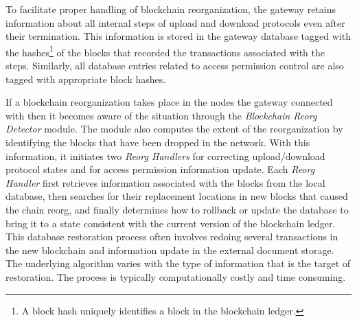 To facilitate proper handling of blockchain reorganization, the gateway retains information about all internal steps of upload and download protocols even after their termination. This information is stored in the gateway database tagged with the hashes\footnote{A block hash uniquely identifies a block in the blockchain ledger.} of the blocks that recorded the transactions associated with the steps. Similarly, all database entries related to access permission control are also tagged with appropriate block hashes.

If a blockchain reorganization takes place in the nodes the gateway connected with then it becomes aware of the situation through the {\it Blockchain Reorg Detector} module. The module also computes the extent of the reorganization by identifying the blocks that have been dropped in the network. With this information, it initiates two {\it Reorg Handlers} for correcting  upload/download protocol states and for access permission information update. Each {\it Reorg Handler} first retrieves information associated with the blocks from the local database, then searches for their replacement locations in new blocks that caused the chain reorg, and finally determines how to rollback or update the database to bring it to a state consistent with the current version of the blockchain ledger. This database restoration process often involves redoing several transactions in the new blockchain and information update in the external document storage. The underlying algorithm varies with the type of information that is the target of restoration. The process is typically computationally costly and time consuming.                  
       
